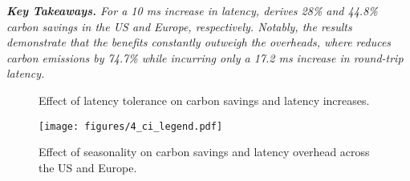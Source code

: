 


\noindent \textit{\textbf{Key Takeaways.} 
For a 10 ms increase in latency, \proposedsystem derives 28\% and 44.8\% carbon savings in the US and Europe, respectively. Notably, the results demonstrate that the benefits constantly outweigh the overheads, where \proposedsystem reduces carbon emissions by 74.7\% while incurring only a 17.2 ms increase in round-trip latency.
}

\begin{figure}[tb]
    \centering
    \quad
    \caption{Effect of latency tolerance on carbon savings and latency increases.} 
    \label{fig:latency_effect}
\end{figure}


\begin{figure*}[t]
    \raggedleft
    \quad\texttt{[image: figures/4\_ci\_legend.pdf]}\quad \quad \quad \\
    \centering
    \quad
    \quad
    \quad
    \caption{Effect of seasonality on carbon savings and latency overhead across the US and Europe.} 
    \label{fig:global_monthly}
    \vspace{-.3cm}
\end{figure*}




